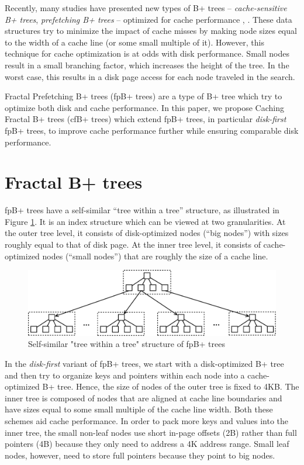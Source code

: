 \documentclass{article}
\begin{document}
Recently, many studies have presented new types of B+ trees --
\textit{cache-sensitive B+ trees}, \textit{prefetching B+ trees} -- optimized
for cache performance \citep{Rao:2000}, \citep{Chen:2001}. These data structures
try to minimize the impact of cache misses by making node sizes equal to the
width of a cache line (or some small multiple of it). However, this technique
for cache optimization is at odds with disk performance. Small nodes result in a
small branching factor, which increases the height of the tree.
In the worst case, this results in a disk page access for each node traveled in
the search.

Fractal Prefetching B+ trees (fpB+ trees) are a type of B+ tree which try to
optimize both disk and cache performance. In this paper, we propose Caching
Fractal B+ trees (cfB+ trees) which extend fpB+ trees, in particular
\textit{disk-first} fpB+ trees, to improve cache performance further while
ensuring comparable disk performance.

\section{Fractal B+ trees}

fpB+ trees have a self-similar ``tree within a tree'' structure, as illustrated
in Figure \ref{fig:fb+tree_struct}. It is an index structure which can be viewed
at two granularities. At the outer tree level, it consists of disk-optimized
nodes (``big nodes'') with sizes roughly equal to that of disk page. At the inner tree level, it
consists of cache-optimized nodes (``small nodes'') that are roughly the size of a cache line.

\begin{figure}[h]
\begin{center}
\includegraphics[width=350pt]{fb+tree_struct}
\end{center}
\caption{
Self-similar "tree within a tree" structure of fpB+ trees
}
\label{fig:fb+tree_struct}
\end{figure}

In the \textit{disk-first} variant of fpB+ trees, we start with a disk-optimized
B+ tree and then try to organize keys and pointers within each node into a
cache-optimized B+ tree. Hence, the size of nodes of the outer tree
is fixed to 4KB. The inner tree is composed of nodes that are
aligned at cache line boundaries and have sizes equal to some small multiple
of the cache line width. Both these schemes aid cache performance. In order to
pack more keys and values into the inner tree, the small non-leaf nodes use
short in-page offsets (2B) rather than full pointers (4B) because they only need
to address a 4K address range. Small leaf nodes, however, need to store full
pointers because they point to big nodes.
\end{document}
